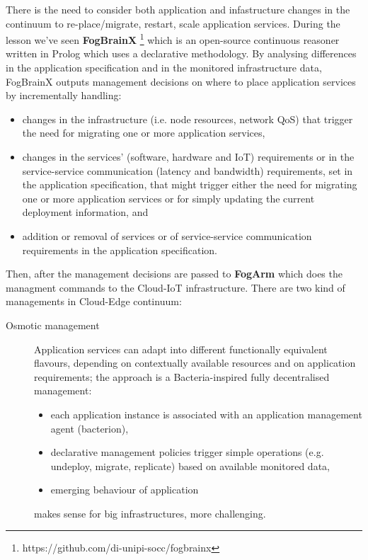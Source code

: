 There is the need to consider both application and infastructure changes in the continuum to re-place/migrate, restart, scale application services. \nl
During the lesson we've seen \textbf{FogBrainX} \footnote{https://github.com/di-unipi-socc/fogbrainx} which is an open-source continuous reasoner written in Prolog which uses a declarative methodology. By analysing differences in the application specification and in the monitored infrastructure data, FogBrainX outputs management decisions on where to place application services by incrementally handling:
\begin{itemize}
   \item changes in the infrastructure (i.e. node resources, network QoS) that trigger the need for migrating one or more application services,
   \item changes in the services' (software, hardware and IoT) requirements or in the service-service communication (latency and bandwidth) requirements, set in the application specification, that might trigger either the need for migrating one or more application services or for simply updating the current deployment information, and
   \item addition or removal of services or of service-service communication requirements in the application specification.
\end{itemize}
Then, after the management decisions are passed to \textbf{FogArm} which does the managment commands to the Cloud-IoT infrastructure. \nl
There are two kind of managements in Cloud-Edge continuum:
\begin{description}
   \item[Osmotic management] Application services can adapt into different functionally equivalent flavours, depending on contextually available resources and on application requirements; the approach is a Bacteria-inspired fully decentralised management:
         \begin{itemize}
            \item each application instance is associated with an application management agent (bacterion),
            \item declarative management policies trigger simple operations (e.g. undeploy, migrate, replicate) based on available monitored data,
            \item emerging behaviour of application
         \end{itemize}
         makes sense for big infrastructures, more challenging.
\end{description}

